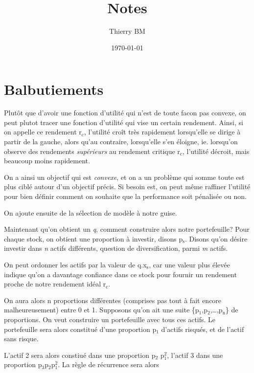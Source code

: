 \documentclass[11pt]{article}
\author{Thierry BM}
\date{\today}
\title{Notes}
\begin{document}
\maketitle
\tableofcontents


\section{Balbutiements}
\label{sec-1}

Plutôt que d'avoir une fonction d'utilité qui n'est de toute facon pas convexe, on peut
plutot tracer une fonction d'utilité qui vise un certain rendement. Ainsi, si on appelle
ce rendement r$_{\text{c}}$, l'utilité croît très rapidement lorsqu'elle se dirige à partir de la
gauche, alors qu'au contraire, lorsqu'elle s'en éloigne, ie. lorsqu'on observe des
rendements \emph{supérieurs} au rendement critique r$_{\text{c}}$, l'utilité décroit, mais beaucoup moins
rapidement.

On a ainsi un objectif qui est \emph{convexe}, et on a un problème qui somme toute est plus ciblé
autour d'un objectif précis. Si besoin est, on peut même raffiner l'utilité pour bien
définir comment on souhaite que la performance soit pénalisée ou non. 

On ajoute ensuite de la sélection de modèle à notre guise.

Maintenant qu'on obtient un \emph{q}, comment construire alors notre portefeuille? Pour chaque
stock, on obtient une proportion à investir, disons p$_{\text{s}}$. Disons qu'on désire investir dans
\emph{n} actifs différents, question de diversification, parmi \emph{m} actifs.

On peut ordonner les actifs par la valeur de q.x$_{\text{s}}$, car une valeur plus élevée indique
qu'on a davantage confiance dans ce stock pour fournir un rendement proche de notre
rendement idéal r$_{\text{c}}$.

On aura alors n proportions différentes (comprises pas tout à fait encore malheureusement)
entre 0 et 1. Supposons qu'on ait une suite \{p$_{\text{1}}$,p$_{\text{2}}$,\ldots{},p$_{\text{n}}$\} de proportions. On veut
construire un portefeuille avec tous ces actifs. Le portefeuille sera alors constitué
d'une proportion p$_{\text{1}}$ d'actifs risqués, et de l'actif sans risque. 

L'actif 2 sera alors constiué dans une proportion p$_{\text{2}}$ p$_{\text{1}}^{\text{2}}$, l'actif 3 dans une proportion
p$_{\text{3}}$p$_{\text{2}}$p$_{\text{1}}^{\text{2}}$. La règle de récurrence sera alors
\end{document}
